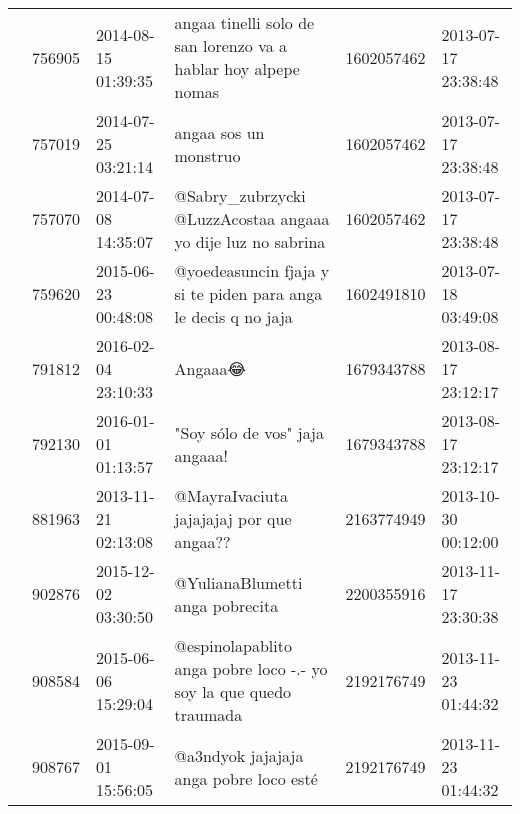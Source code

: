 \begin{tabular}{llllrl}
           & 756905  & 2014-08-15 01:39:35 &                                                                               angaa tinelli solo de san lorenzo va a hablar hoy alpepe nomas &  1602057462 & 2013-07-17 23:38:48 \\
           & 757019  & 2014-07-25 03:21:14 &                                                                                                                        angaa sos un monstruo &  1602057462 & 2013-07-17 23:38:48 \\
           & 757070  & 2014-07-08 14:35:07 &                                                                                  @Sabry\_zubrzycki @LuzzAcostaa angaaa yo dije luz no sabrina &  1602057462 & 2013-07-17 23:38:48 \\
           & 759620  & 2015-06-23 00:48:08 &                                                                               @yoedeasuncin fjaja y si te piden para anga le decis q no jaja &  1602491810 & 2013-07-18 03:49:08 \\
           & 791812  & 2016-02-04 23:10:33 &                                                                                                                                      Angaaa😂 &  1679343788 & 2013-08-17 23:12:17 \\
           & 792130  & 2016-01-01 01:13:57 &                                                                                                               "Soy sólo de vos" jaja angaaa! &  1679343788 & 2013-08-17 23:12:17 \\
           & 881963  & 2013-11-21 02:13:08 &                                                                                                     @MayraIvaciuta jajajajaj por que angaa?? &  2163774949 & 2013-10-30 00:12:00 \\
           & 902876  & 2015-12-02 03:30:50 &                                                                                                              @YulianaBlumetti anga pobrecita &  2200355916 & 2013-11-17 23:30:38 \\
           & 908584  & 2015-06-06 15:29:04 &                                                                            @espinolapablito anga pobre loco -.- yo soy la que quedo traumada &  2192176749 & 2013-11-23 01:44:32 \\
           & 908767  & 2015-09-01 15:56:05 &                                                                                                       @a3ndyok jajajaja anga pobre loco esté &  2192176749 & 2013-11-23 01:44:32 \\

\end{tabular}
